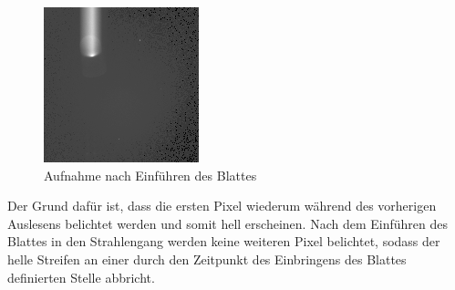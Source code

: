 \begin{figure}[h!]
\centering
        \includegraphics[width=.4\textwidth]{smear_oben_frueh.png}
\caption{ Aufnahme nach Einführen des Blattes }
\label{fig:smear3}
\end{figure}
Der Grund dafür ist, dass die ersten Pixel wiederum während des vorherigen Auslesens belichtet werden und somit hell erscheinen. Nach dem Einführen des Blattes in den Strahlengang werden keine weiteren Pixel belichtet, sodass der helle Streifen an einer durch den Zeitpunkt des Einbringens des Blattes definierten Stelle abbricht. 
